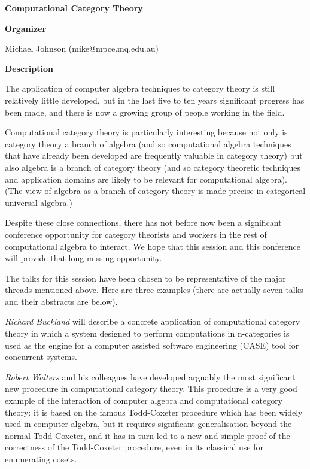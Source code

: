 \begin{center}
{\LARGE \bf Computational Category Theory
}
\end{center}
\bigskip

{\bf Organizer}

\medskip

Michael Johnson (mike@mpce.mq.edu.au)

\bigskip

{\bf Description}
\medskip

The application of computer algebra techniques to category theory is still relatively little
developed, but in the last five to ten years significant progress has been made, and there is now a
growing group of people working in the field. 

Computational category theory is particularly interesting because not only is category theory a
branch of algebra (and so computational algebra techniques that have already been developed are
frequently valuable in category theory) but also algebra is a branch of category theory (and so
category theoretic techniques and application domains are likely to be relevant for computational
algebra). (The view of algebra as a branch of category theory is made precise in categorical
universal algebra.) 

Despite these close connections, there has not before now been a significant conference
opportunity for category theorists and workers in the rest of computational algebra to interact. We
hope that this session and this conference will provide that long missing opportunity. 

The talks for this session have been chosen to be representative of the major threads mentioned
above. Here are three examples (there are actually seven talks and their abstracts are below). 

{\em Richard Buckland} will describe a concrete application of computational category theory in which a
system designed to perform computations in n-categories is used as the engine for a computer
assisted software engineering (CASE) tool for concurrent systems. 

{\em Robert Walters} and his colleagues have developed arguably the most significant new procedure in
computational category theory. This procedure is a very good example of the interaction of
computer algebra and computational category theory: it is based on the famous Todd-Coxeter
procedure which has been widely used in computer algebra, but it requires significant
generalisation beyond the normal Todd-Coxeter, and it has in turn led to a new and simple proof
of the correctness of the Todd-Coxeter procedure, even in its classical use for enumerating cosets. 

